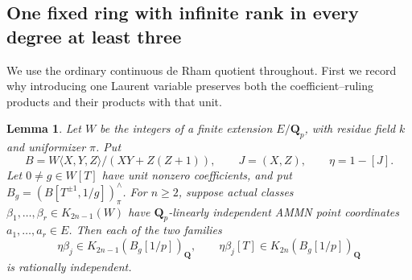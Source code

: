 \documentclass[11pt,a4paper]{article}
\newtheorem{lemma}[theorem]{Lemma}
\theoremstyle{remark}
\newcommand{\Q}{\mathbf Q}
\begin{document}


\subsection{One fixed ring with infinite rank in every degree at least three}
\label{sec:singlefixedalldegree}

We use the ordinary continuous de Rham quotient throughout.
First we record why introducing one Laurent variable preserves both
the coefficient--ruling products and their products with that unit.

\begin{lemma}\label{lem:onelaurentcoefficientdetector}
Let $W$ be the integers of a finite extension $E/\Q_p$, with
residue field $k$ and uniformizer $\pi$. Put
\[
 B=W\langle X,Y,Z\rangle/(XY+Z(Z+1)),\qquad
 J=(X,Z),\qquad \eta=1-[J].
\]
Let $0\ne g\in W[T]$ have unit nonzero coefficients, and put
$B_g=(B[T^{\pm1},1/g])^\wedge_\pi$.
For $n\geq2$, suppose actual classes
$\beta_1,\ldots,\beta_r\in K_{2n-1}(W)$ have
$\Q_p$-linearly independent AMMN point coordinates
$a_1,\ldots,a_r\in E$.
Then each of the two families
\[
 \eta\beta_j\in K_{2n-1}(B_g[1/p])_{\Q},\qquad
 \eta\beta_j[T]\in K_{2n}(B_g[1/p])_{\Q}
\]
is rationally independent.
\end{lemma}
\end{document}
